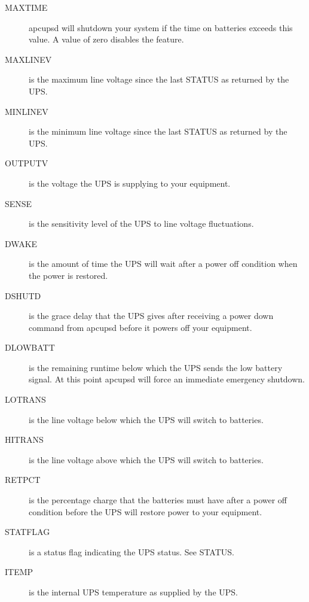 {{{{{{{{{{{{{{{\begin{description}
\item [MAXTIME]
   apcupsd will shutdown your system if the time on batteries exceeds this value.
A value of zero disables the feature.  

\item [MAXLINEV]
   is the maximum line voltage since the last STATUS as returned by the UPS.  

\item [MINLINEV]
   is the minimum line voltage since the last STATUS as returned by the UPS.  

\item [OUTPUTV]
   is the voltage the UPS is supplying to your equipment.  

\item [SENSE]
   is the sensitivity level of the UPS to line voltage fluctuations.  

\item [DWAKE]
   is the amount of time the UPS will wait after a power off condition when the
power is restored.  

\item [DSHUTD]
   is the grace delay that the UPS gives after receiving a power down command
from apcupsd before it powers off your equipment.  

\item [DLOWBATT]
   is the remaining runtime below which the UPS sends the low battery signal. At
this point apcupsd will force an immediate emergency shutdown.  

\item [LOTRANS]
   is the line voltage below which the UPS will switch to batteries.  

\item [HITRANS]
   is the line voltage above which the UPS will switch to batteries.  

\item [RETPCT]
   is the percentage charge that the batteries must have after a power off
condition before the UPS will restore power to your equipment.  

\item [STATFLAG]
   is a status flag indicating the UPS status. See STATUS.  

\item [ITEMP]
   is the internal UPS temperature as supplied by the UPS.  


\end{description}}}}}}}}}}}}}}}}
